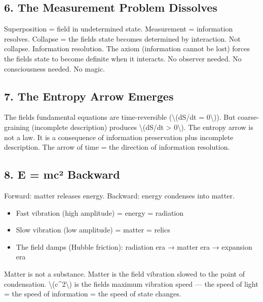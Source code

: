 \documentclass[
  10pt,
]{article}
\providecommand{\tightlist}{%
  \setlength{\itemsep}{0pt}\setlength{\parskip}{0pt}}
\begin{document}
\hypertarget{the-measurement-problem-dissolves}{%
\subsection{6. The Measurement Problem
Dissolves}\label{the-measurement-problem-dissolves}}

Superposition = field in undetermined state. Measurement = information
resolves. Collapse = the field\textquotesingle s state becomes
determined by interaction. Not collapse. Information resolution. The
axiom (information cannot be lost) forces the field\textquotesingle s
state to become definite when it interacts. No observer needed. No
consciousness needed. No magic.

\hypertarget{the-entropy-arrow-emerges}{%
\subsection{7. The Entropy Arrow
Emerges}\label{the-entropy-arrow-emerges}}

The field\textquotesingle s fundamental equations are time-reversible
(\textbackslash(dS/dt = 0\textbackslash)). But coarse-graining
(incomplete description) produces \textbackslash(dS/dt \textgreater{}
0\textbackslash). The entropy arrow is not a law. It is a consequence of
information preservation plus incomplete description. The arrow of time
= the direction of information resolution.

\hypertarget{e-mcuxb2-backward}{%
\subsection{8. E = mc² Backward}\label{e-mcuxb2-backward}}

Forward: matter releases energy. Backward: energy condenses into matter.

\begin{itemize}
\tightlist
\item
  Fast vibration (high amplitude) = energy = radiation
\item
  Slow vibration (low amplitude) = matter = relics
\item
  The field damps (Hubble friction): radiation era → matter era →
  expansion era
\end{itemize}

Matter is not a substance. Matter is the field vibration slowed to the
point of condensation. \textbackslash(c\^{}2\textbackslash) is the
field\textquotesingle s maximum vibration speed --- the speed of light =
the speed of information = the speed of state changes.
\end{document}
